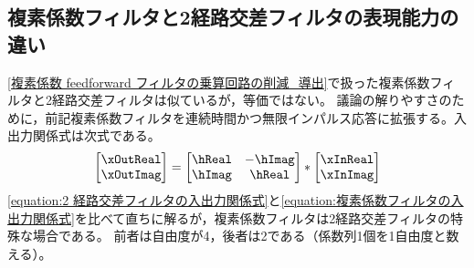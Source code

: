     \subsection{複素係数フィルタと2経路交差フィルタの表現能力の違い}
        \ref{複素係数 feedforward フィルタの乗算回路の削減_導出}で扱った複素係数フィルタと2経路交差フィルタは似ているが，等価ではない。
        議論の解りやすさのために，前記複素係数フィルタを連続時間かつ無限インパルス応答に拡張する。入出力関係式は次式である。
        \begin{equation}
            \label{equation:複素係数フィルタの入出力関係式}
            \begin{bmatrix}
                \xOutReal \\
                \xOutImag
            \end{bmatrix} = \begin{bmatrix}
                \hReal & -\hImag \\
                \hImag & \hReal
            \end{bmatrix} *
            \begin{bmatrix}
                \xInReal \\
                \xInImag
            \end{bmatrix}
        \end{equation}
        \cref{equation:2 経路交差フィルタの入出力関係式}と\cref{equation:複素係数フィルタの入出力関係式}を比べて直ちに解るが，複素係数フィルタは2経路交差フィルタの特殊な場合である。
        前者は自由度が4，後者は2である（係数列1個を1自由度と数える）。
